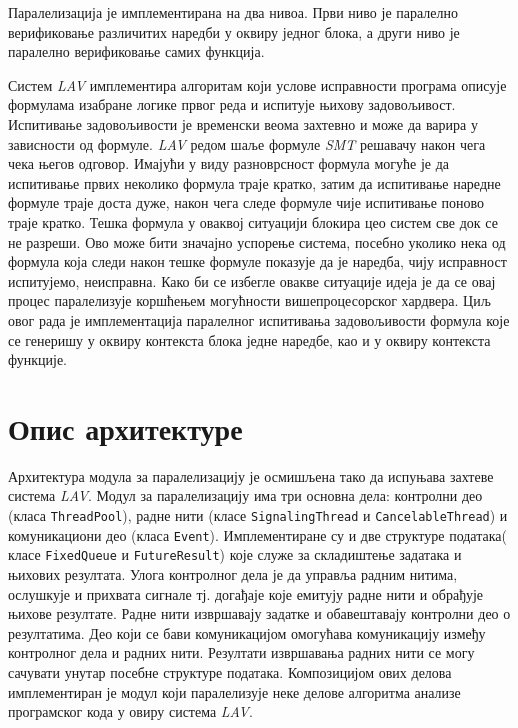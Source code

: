 \documentclass[12pt,oneside]{memoir}
\begin{document}
Паралелизација је имплементирана на два нивоа. Први ниво је паралелно верификовање различитих наредби у оквиру једног блока, а други ниво је паралелно верификовање самих функција.

Систем \textit{LAV} имплементира алгоритам који услове исправности програма описује формулама изабране логике првог реда и испитује њихову задовољивост.  Испитивање задовољивости је  временски веома захтевно и може да варира у зависности од формуле. \textit{LAV} редом шаље формуле \textit{SMT} решавачу након чега чека његов одговор. Имајући у виду разноврсност формула могуће је да испитивање првих неколико формула траје кратко, затим да испитивање наредне формуле траје доста дуже, након чега следе формуле чије испитивање поново траје кратко. Тешка формула у оваквој ситуацији блокира цео систем све док се не разреши. Ово може бити значајно успорење система, посебно уколико нека од формула која следи након тешке формуле показује да је наредба, чију исправност испитујемо, неисправна. 	
Како би се избегле овакве ситуације идеја је да се овај процес паралелизује коршћењем могућности вишепроцесорског хардвера. Циљ овог рада је имплементација паралелног испитивања задовољивости формула које се генеришу у оквиру контекста блока једне наредбе, као и у оквиру контекста функције. 

\section{Опис архитектуре}

Архитектура модула за паралелизацију је осмишљена тако да испуњава захтеве система \textit{LAV}. Модул за паралелизацију има три основна дела: контролни део (класа \texttt{ThreadPool}), радне нити (класе \texttt{SignalingThread} и \texttt{CancelableThread}) и комуникациони део (класа \texttt{Event}). Имплементиране су и две структуре података( класе \texttt{FixedQueue} и \texttt{FutureResult}) које служе за складиштење задатака и њихових резултата. Улога контролног дела је да управља радним нитима, ослушкује и прихвата сигнале тј. догађаје које емитују радне нити и обрађује њихове резултате. Радне нити извршавају задатке и обавештавају контролни део о резултатима. Део који се бави комуникацијом омогућава комуникацију између контролног дела и радних нити. Резултати извршавања радних нити се могу сачувати унутар посебне структуре података. Композицијом ових делова имплементиран је модул који паралелизује неке делове алгоритма анализе програмског кода у овиру система \textit{LAV}. 
\end{document}
